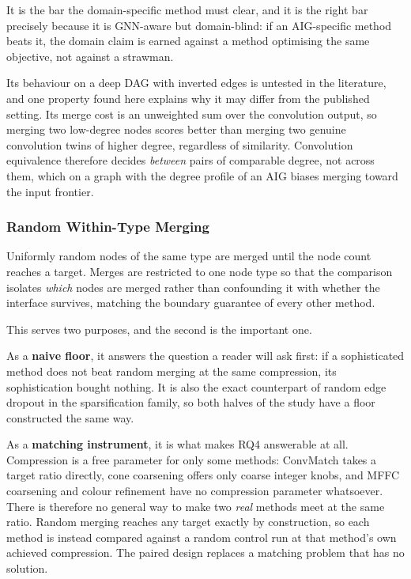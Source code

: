 It is the bar the domain-specific method must clear, and it is the right bar precisely
because it is GNN-aware but domain-blind: if an AIG-specific method beats it, the domain
claim is earned against a method optimising the same objective, not against a strawman.

Its behaviour on a deep DAG with inverted edges is untested in the literature, and one
property found here explains why it may differ from the published setting. Its merge cost is
an unweighted sum over the convolution output, so merging two low-degree nodes scores better
than merging two genuine convolution twins of higher degree, regardless of similarity.
Convolution equivalence therefore decides \emph{between} pairs of comparable degree, not
across them, which on a graph with the degree profile of an AIG biases merging toward the
input frontier.


\subsubsection{Random Within-Type Merging}
\label{sec:method:summary:random}
Uniformly random nodes of the same type are merged until the node count reaches a target.
Merges are restricted to one node type so that the comparison isolates \emph{which} nodes are
merged rather than confounding it with whether the interface survives, matching the boundary
guarantee of every other method.

This serves two purposes, and the second is the important one.

As a \textbf{naive floor}, it answers the question a reader will ask first: if a
sophisticated method does not beat random merging at the same compression, its sophistication
bought nothing. It is also the exact counterpart of random edge dropout in the sparsification
family, so both halves of the study have a floor constructed the same way.

As a \textbf{matching instrument}, it is what makes RQ4 answerable at all. Compression is a
free parameter for only some methods: ConvMatch takes a target ratio directly, cone
coarsening offers only coarse integer knobs, and MFFC coarsening and colour refinement have
no compression parameter whatsoever. There is therefore no general way to make two \emph{real}
methods meet at the same ratio. Random merging reaches any target exactly by construction, so
each method is instead compared against a random control run at that method's own achieved
compression. The paired design replaces a matching problem that has no solution.

